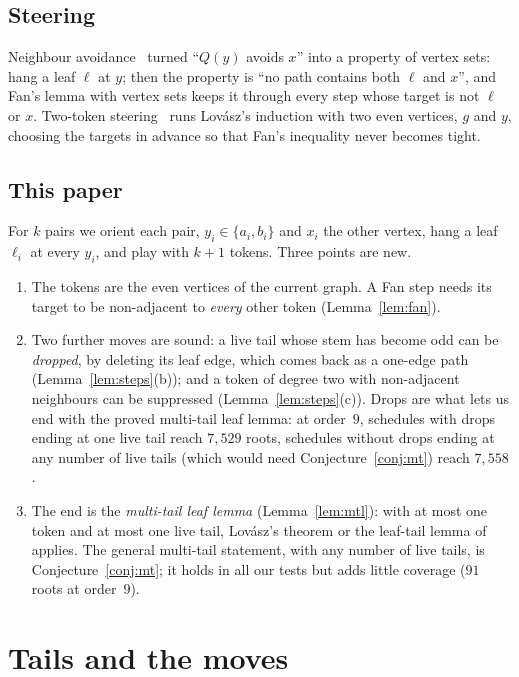 \documentclass[11pt]{amsart}
\theoremstyle{definition}
\begin{document}
\subsection*{Steering} Neighbour avoidance~\cite{NA} turned ``$Q(y)$ avoids $x$'' into a property
of vertex sets: hang a leaf $\ell$ at $y$; then the property is ``no path contains both $\ell$ and
$x$'', and Fan's lemma with vertex sets keeps it through every step whose target is not $\ell$ or
$x$. Two-token steering~\cite[\S6]{TRN} runs Lov\'asz's induction with two even vertices, $g$ and
$y$, choosing the targets in advance so that Fan's inequality never becomes tight.

\subsection*{This paper} For $k$ pairs we orient each pair, $y_i\in\{a_i,b_i\}$ and $x_i$ the
other vertex, hang a leaf $\ell_i$ at every $y_i$, and play with $k+1$ tokens. Three points are new.
\begin{enumerate}
\item The tokens are the even vertices of the current graph. A Fan step needs its target to be
non-adjacent to \emph{every} other token (Lemma~\ref{lem:fan}).
\item Two further moves are sound: a live tail whose stem has become odd can be \emph{dropped}, by
deleting its leaf edge, which comes back as a one-edge path (Lemma~\ref{lem:steps}(b)); and a token
of degree two with non-adjacent neighbours can be suppressed (Lemma~\ref{lem:steps}(c)). Drops are
what lets us end with the proved multi-tail leaf lemma: at order~$9$, schedules with drops ending
at one live tail reach $7{,}529$ roots, schedules without drops ending at any number of live tails
(which would need Conjecture~\ref{conj:mt}) reach $7{,}558$.
\item The end is the \emph{multi-tail leaf lemma} (Lemma~\ref{lem:mtl}): with at most one token and
at most one live tail, Lov\'asz's theorem or the leaf-tail lemma of~\cite{TRN} applies. The
general multi-tail statement, with any number of live tails, is Conjecture~\ref{conj:mt}; it holds
in all our tests but adds little coverage ($91$ roots at order~$9$).
\end{enumerate}

\section{Tails and the moves}\label{sec:sched}
\end{document}
